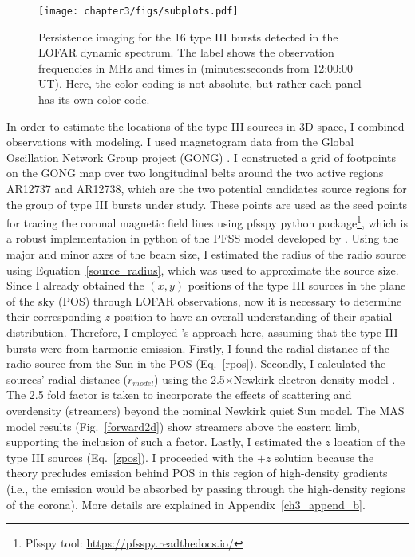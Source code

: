 \begin{figure}[!htp]
\centering
\texttt{[image: chapter3/figs/subplots.pdf]}
\caption{Persistence imaging for the 16 type III bursts detected in the LOFAR dynamic spectrum. The label shows the observation frequencies in MHz and times in (minutes:seconds from 12:00:00 UT). Here, the color coding is not absolute, but rather each panel has its own color code.}
\label{fig_persistence}
\end{figure}

In order to estimate the locations of the type III sources in 3D space, I combined observations with modeling. I used magnetogram data from the Global Oscillation Network Group project (GONG) \citep{gong_1996}. I constructed a grid of footpoints on the GONG map over two longitudinal belts around the two active regions AR12737 and AR12738, which are the two potential candidates source regions for the group of type III bursts under study. These points are used as the seed points for tracing the coronal magnetic field lines using pfsspy python package\footnote{Pfsspy tool: \url{https://pfsspy.readthedocs.io/}}, which is a robust implementation in python of the PFSS model developed by \citet{pfss_2020}.
Using the major and minor axes of the beam size, I estimated the radius of the radio source using Equation~\ref{source_radius}, which was used to approximate the source size.
Since I already obtained the $(x,y)$ positions of the type III sources in the plane of the sky (POS) through LOFAR observations, now it is necessary to determine their corresponding $z$ position to have an overall understanding of their spatial distribution. Therefore, I employed \citet{badman_2022}'s approach here, assuming that the type III bursts were from harmonic emission. Firstly, I found the radial distance of the radio source from the Sun in the POS (Eq.~\ref{rpos}). Secondly, I calculated the sources' radial distance ($r_{model}$) using the 2.5$\times$Newkirk electron-density model \citep{newkirk_1961, newkirk_1967}. The 2.5 fold factor is taken to incorporate the effects of scattering and overdensity (streamers) beyond the nominal Newkirk quiet Sun model. The MAS model results (Fig.~\ref{forward2d}) show streamers above the eastern limb, supporting the inclusion of such a factor.
Lastly, I estimated the $z$ location of the type III sources (Eq.~\ref{zpos}).
I proceeded with the $+z$ solution because the theory precludes emission behind POS in this region of high-density gradients (i.e., the emission would be absorbed by passing through the high-density regions of the corona). More details are explained in Appendix~\ref{ch3_append_b}.

